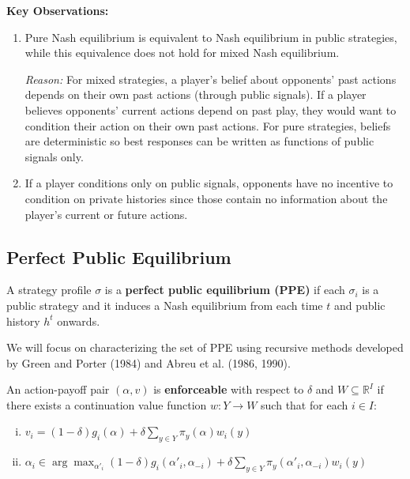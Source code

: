 \documentclass[11pt]{elegantbook_2}
\begin{document}
\textbf{Key Observations:}
\begin{enumerate}
    \item Pure Nash equilibrium is equivalent to Nash equilibrium in public strategies, while this equivalence does not hold for mixed Nash equilibrium.
    
    \textit{Reason:} For mixed strategies, a player's belief about opponents' past actions depends on their own past actions (through public signals). If a player believes opponents' current actions depend on past play, they would want to condition their action on their own past actions. For pure strategies, beliefs are deterministic so best responses can be written as functions of public signals only.
    
    \item If a player conditions only on public signals, opponents have no incentive to condition on private histories since those contain no information about the player's current or future actions.
\end{enumerate}


\subsection{Perfect Public Equilibrium}
\begin{definition}
    A strategy profile $\sigma$ is a \textbf{perfect public equilibrium (PPE)} if each $\sigma_i$ is a public strategy and it induces a Nash equilibrium from each time $t$ and public history $h^t$ onwards.
\end{definition}

We will focus on characterizing the set of PPE using recursive methods developed by Green and Porter (1984) and Abreu et al. (1986, 1990).

\begin{definition}[Enforceability]
    An action-payoff pair $(\alpha,v)$ is \textbf{enforceable} with respect to $\delta$ and $W \subseteq \mathbb{R}^I$ if there exists a continuation value function $w:Y\rightarrow W$ such that for each $i\in I$:
    \begin{enumerate}[(i)]
        \item $v_i=(1-\delta)g_i(\alpha)+\delta\sum_{y\in Y}\pi_y(\alpha)w_i(y)$
        \item $\alpha_i \in \arg\max_{\alpha'_i}(1-\delta)g_i(\alpha'_i,\alpha_{-i})+\delta\sum_{y\in Y}\pi_y(\alpha'_i,\alpha_{-i})w_i(y)$
    \end{enumerate}
\end{definition}
\end{document}
